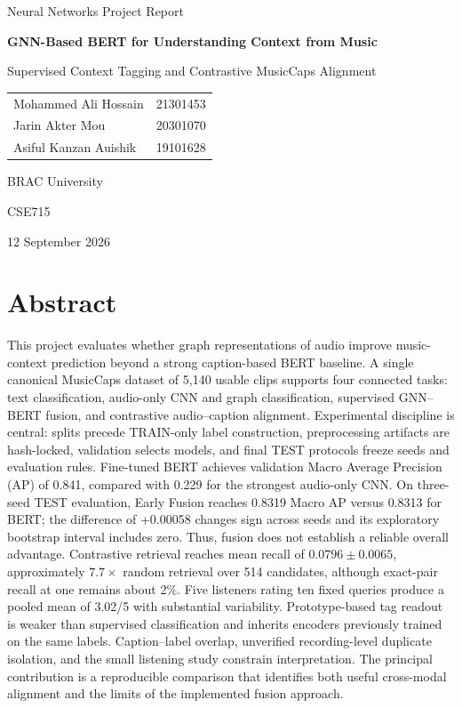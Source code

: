 \documentclass[conference]{IEEEtran}
\newcommand{\reportauthors}{\begin{tabular}{lc}Mohammed Ali Hossain & 21301453\\[0.3em]Jarin Akter Mou & 20301070\\[0.3em]Asiful Kanzan Auishik & 19101628\end{tabular}}
\newcommand{\reportinstitution}{BRAC University}
\begin{document}
\onecolumn
\begin{titlepage}
\centering
\vspace*{1.2cm}
{\Large Neural Networks Project Report\par}
\vspace{1.2cm}
{\LARGE\bfseries GNN-Based BERT for Understanding Context from Music\par}
\vspace{0.7cm}
{\large Supervised Context Tagging and Contrastive MusicCaps Alignment\par}
\vspace{1.3cm}
{\large\reportauthors\par}
\vspace{0.5cm}
{\large\reportinstitution\par}
\vspace{0.8cm}
{CSE715\par}
{12 September 2026\par}
\vspace{1.1cm}
\begin{minipage}{0.88\textwidth}
\section*{Abstract}
This project evaluates whether graph representations of audio improve music-context prediction beyond a strong caption-based BERT baseline. A single canonical MusicCaps dataset of 5,140 usable clips supports four connected tasks: text classification, audio-only CNN and graph classification, supervised GNN--BERT fusion, and contrastive audio--caption alignment. Experimental discipline is central: splits precede TRAIN-only label construction, preprocessing artifacts are hash-locked, validation selects models, and final TEST protocols freeze seeds and evaluation rules. Fine-tuned BERT achieves validation Macro Average Precision (AP) of 0.841, compared with 0.229 for the strongest audio-only CNN. On three-seed TEST evaluation, Early Fusion reaches 0.8319 Macro AP versus 0.8313 for BERT; the difference of +0.00058 changes sign across seeds and its exploratory bootstrap interval includes zero. Thus, fusion does not establish a reliable overall advantage. Contrastive retrieval reaches mean recall of $0.0796\pm0.0065$, approximately $7.7\times$ random retrieval over 514 candidates, although exact-pair recall at one remains about 2\%. Five listeners rating ten fixed queries produce a pooled mean of 3.02/5 with substantial variability. Prototype-based tag readout is weaker than supervised classification and inherits encoders previously trained on the same labels. Caption--label overlap, unverified recording-level duplicate isolation, and the small listening study constrain interpretation. The principal contribution is a reproducible comparison that identifies both useful cross-modal alignment and the limits of the implemented fusion approach.
\end{minipage}
\vfill
\end{titlepage}
\pagestyle{plain}
\setcounter{tocdepth}{1}
\tableofcontents
\clearpage
\twocolumn
\end{document}
